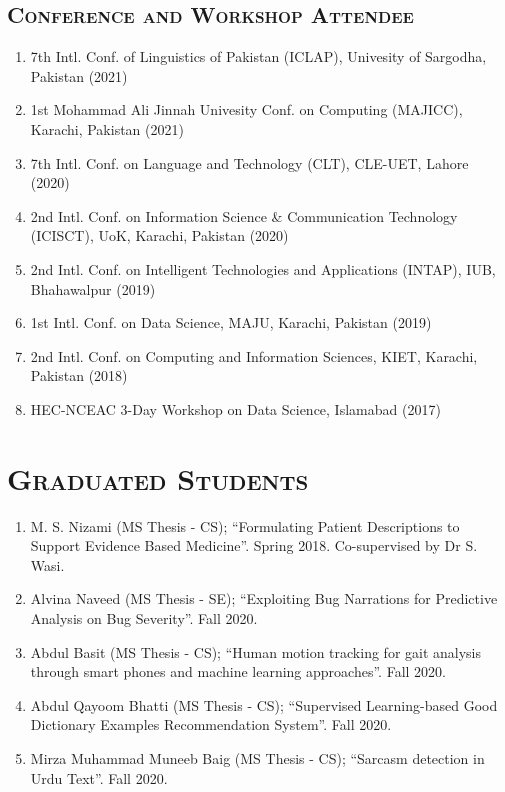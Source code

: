 \documentclass[a4paper, 10pt]{article}
\begin{document}
\subsection*{\normalfont\textsc{Conference and Workshop Attendee}}
\begin{enumerate}
\itemsep-4pt
\item 7th Intl. Conf. of Linguistics of Pakistan (ICLAP), Univesity of Sargodha, Pakistan (2021)
\item 1st Mohammad Ali Jinnah Univesity Conf. on Computing (MAJICC), Karachi, Pakistan (2021)
\item 7th Intl. Conf. on Language and Technology (CLT), CLE-UET, Lahore (2020)
\item 2nd Intl. Conf. on Information Science \& Communication Technology (ICISCT), UoK, Karachi, Pakistan (2020)
\item 2nd Intl. Conf. on Intelligent Technologies and Applications (INTAP), IUB, Bhahawalpur (2019)
\item 1st Intl. Conf. on Data Science, MAJU, Karachi, Pakistan (2019)
\item 2nd Intl. Conf. on Computing and Information Sciences, KIET, Karachi, Pakistan (2018)
\item HEC-NCEAC 3-Day Workshop on Data Science, Islamabad (2017) 
\end{enumerate}


\section*{\normalfont\textsc{Graduated Students}}
\begin{enumerate}
\itemsep-4pt 
 \item M. S. Nizami (MS Thesis - CS); ``Formulating Patient Descriptions to Support Evidence Based Medicine''. Spring 2018. Co-supervised by Dr S. Wasi.

 \item Alvina Naveed (MS Thesis - SE); ``Exploiting Bug Narrations for Predictive Analysis on Bug Severity''. Fall 2020.

 \item Abdul Basit (MS Thesis - CS); ``Human motion tracking for gait analysis through smart phones and machine learning approaches''.  Fall 2020.

  \item Abdul Qayoom Bhatti (MS Thesis - CS); ``Supervised Learning-based Good Dictionary Examples Recommendation System''.  Fall 2020. 
  
  \item Mirza Muhammad Muneeb Baig (MS Thesis - CS); ``Sarcasm detection in Urdu Text''. Fall 2020.
\end{enumerate}
\end{document}
